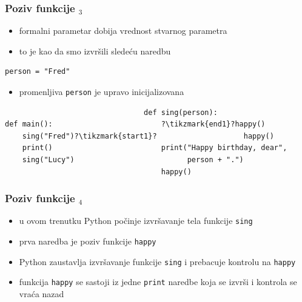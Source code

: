\documentclass[compress]{beamer}
\begin{document}
\begin{frame}[fragile]
  \frametitle{Poziv funkcije $_3$}
  \begin{itemize}
    \item formalni parametar dobija vrednost stvarnog parametra
    \item to je kao da smo izvršili sledeću naredbu
  \end{itemize}
\begin{verbatim}
person = "Fred"
\end{verbatim}
  \begin{itemize}
    \item promenljiva \texttt{person} je upravo inicijalizovana
  \end{itemize}
\begin{verbatim}
                                def sing(person):
def main():                         ?\tikzmark{end1}?happy()
    sing("Fred")?\tikzmark{start1}?                    happy()
    print()                         print("Happy birthday, dear", 
    sing("Lucy")                          person + ".")
                                    happy()
\end{verbatim}
\end{frame}

\begin{frame}[fragile]
  \frametitle{Poziv funkcije $_4$}
  \begin{itemize}
    \item u ovom trenutku Python počinje izvršavanje tela funkcije \texttt{sing}
    \item prva naredba je poziv funkcije \texttt{happy}
    \item Python zaustavlja izvršavanje funkcije \texttt{sing} i prebacuje kontrolu na \texttt{happy}
    \item funkcija \texttt{happy} se sastoji iz jedne \texttt{print} naredbe koja se izvrši i kontrola se vraća nazad
  \end{itemize}
\end{frame}
\end{document}
